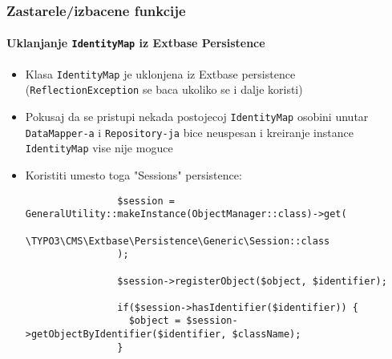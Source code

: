 \begin{frame}[fragile]
	\frametitle{Zastarele/izbacene funkcije}
	\framesubtitle{Uklanjanje \texttt{IdentityMap} iz Extbase Persistence}

	\lstset{basicstyle=\tiny\ttfamily}

	\begin{itemize}

		\item Klasa \texttt{IdentityMap} je uklonjena iz Extbase persistence\newline
			\small(\texttt{ReflectionException} se baca ukoliko se i dalje koristi)\normalsize

		\item Pokusaj da se pristupi nekada postojecoj \texttt{IdentityMap} osobini unutar 
			\texttt{DataMapper-a} i \texttt{Repository-ja} bice neuspesan i kreiranje instance
			\texttt{IdentityMap} vise nije moguce

		\item Koristiti umesto toga "Sessions" persistence:

			\begin{lstlisting}
				$session = GeneralUtility::makeInstance(ObjectManager::class)->get(
				  \TYPO3\CMS\Extbase\Persistence\Generic\Session::class
				);

				$session->registerObject($object, $identifier);

				if($session->hasIdentifier($identifier)) {
				  $object = $session->getObjectByIdentifier($identifier, $className);
				}
			\end{lstlisting}

	\end{itemize}

\end{frame}


